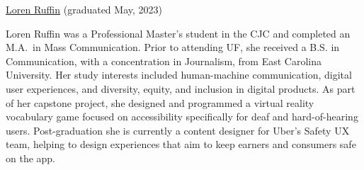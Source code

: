 \documentclass[]{article}
\begin{document}
\href{https://www.linkedin.com/in/loren-ruffin/}{Loren Ruffin}
(graduated May, 2023)

Loren Ruffin was a Professional Master's student in the CJC and
completed an M.A.~in Mass Communication. Prior to attending UF, she
received a B.S. in Communication, with a concentration in Journalism,
from East Carolina University. Her study interests included
human-machine communication, digital user experiences, and diversity,
equity, and inclusion in digital products. As part of her capstone
project, she designed and programmed a virtual reality vocabulary game
focused on accessibility specifically for deaf and hard-of-hearing
users. Post-graduation she is currently a content designer for Uber's
Safety UX team, helping to design experiences that aim to keep earners
and consumers safe on the app.\\
\end{document}
